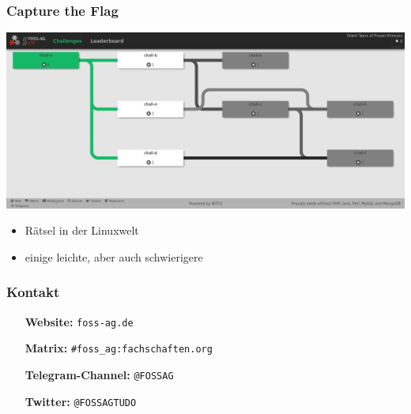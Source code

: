 \documentclass[12pt,utf8]{beamer}
\begin{document}
	\begin{frame}
		\frametitle{Capture the Flag}
		\includegraphics[width=\linewidth]{resources/screenshot_ctf.png}
		\begin{itemize}
			\item Rätsel in der Linuxwelt
			\vspace{0.5cm}
			\item einige leichte, aber auch schwierigere
		\end{itemize}
	\end{frame}
	
	\begin{frame}
		\frametitle{Kontakt}

		
		\begin{itemize}[leftmargin=4cm]
			\item[\textbf{Website:}]\texttt{foss-ag.de}
			\vspace{0.5cm}
			\item[\textbf{Matrix:}] \texttt{\#foss\_ag:fachschaften.org}
			\vspace{0.5cm}
			\item[\textbf{Telegram-Channel:}] \texttt{@FOSSAG}
			\vspace{0.5cm}
			\item[\textbf{Twitter:}] \texttt{@FOSSAGTUDO}	
			
		\end{itemize}
	\end{frame}
\end{document}
